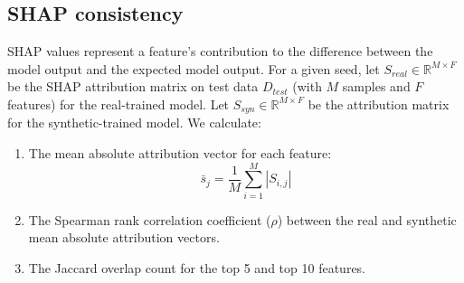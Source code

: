 \documentclass[journal]{IEEEtran}
\begin{document}
\subsection{SHAP consistency}
SHAP values represent a feature's contribution to the difference between the model output and the expected model output. For a given seed, let $S_{real} \in \mathbb{R}^{M \times F}$ be the SHAP attribution matrix on test data $D_{test}$ (with $M$ samples and $F$ features) for the real-trained model. Let $S_{syn} \in \mathbb{R}^{M \times F}$ be the attribution matrix for the synthetic-trained model. We calculate:
\begin{enumerate}
    \item The mean absolute attribution vector for each feature:
    \begin{equation}
        \bar{s}_j = \frac{1}{M}\sum_{i=1}^M |S_{i, j}|
    \end{equation}
    \item The Spearman rank correlation coefficient ($\rho$) between the real and synthetic mean absolute attribution vectors.
    \item The Jaccard overlap count for the top 5 and top 10 features.
\end{enumerate}
\end{document}
